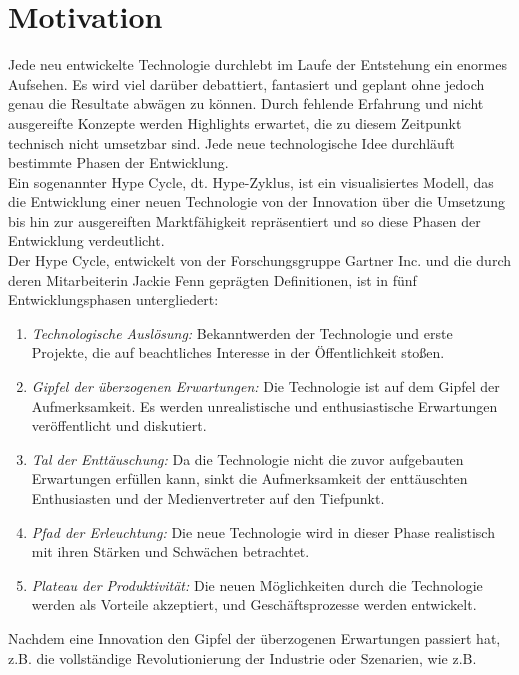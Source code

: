\section{Motivation}
\label{chap:Motivation}
Jede neu entwickelte Technologie durchlebt im Laufe der Entstehung ein enormes Aufsehen. Es wird viel darüber debattiert, fantasiert 
und geplant ohne jedoch genau die Resultate abwägen zu können. Durch fehlende Erfahrung und nicht ausgereifte Konzepte werden Highlights 
erwartet, die zu diesem Zeitpunkt technisch nicht umsetzbar sind. Jede neue technologische Idee durchläuft bestimmte Phasen der Entwicklung.
\cite{studiob12.2020j} 
\\ 
\linebreak
Ein sogenannter Hype Cycle, dt. Hype-Zyklus, ist ein visualisiertes Modell, das die Entwicklung einer neuen Technologie von der 
Innovation über die Umsetzung bis hin zur ausgereiften Marktfähigkeit repräsentiert und so diese Phasen der Entwicklung verdeutlicht.
\\
Der Hype Cycle, entwickelt von der Forschungsgruppe Gartner Inc. und die durch deren Mitarbeiterin Jackie Fenn geprägten Definitionen, ist 
in fünf Entwicklungsphasen untergliedert:
\begin{enumerate}
    \item \textit{Technologische Auslösung:} Bekanntwerden der Technologie und erste Projekte, die auf beachtliches Interesse in der 
    Öffentlichkeit stoßen. 
    \item \textit{Gipfel der überzogenen Erwartungen:} Die Technologie ist auf dem Gipfel der Aufmerksamkeit. Es werden unrealistische 
    und enthusiastische Erwartungen veröffentlicht und diskutiert.
    \item \textit{Tal der Enttäuschung:} Da die Technologie nicht die zuvor aufgebauten Erwartungen erfüllen kann, sinkt die Aufmerksamkeit 
    der enttäuschten Enthusiasten und der Medienvertreter auf den Tiefpunkt.
    \item \textit{Pfad der Erleuchtung:} Die neue Technologie wird in dieser Phase realistisch mit ihren Stärken und Schwächen betrachtet.
    \item \textit{Plateau der Produktivität:} Die neuen Möglichkeiten durch die Technologie werden als Vorteile akzeptiert, und 
    Geschäftsprozesse werden entwickelt. \cite{gartnerhc.2016s}
\end{enumerate} 
Nachdem eine Innovation den Gipfel der überzogenen Erwartungen passiert hat, z.B. die vollständige Revolutionierung der Industrie oder Szenarien, wie z.B. 
